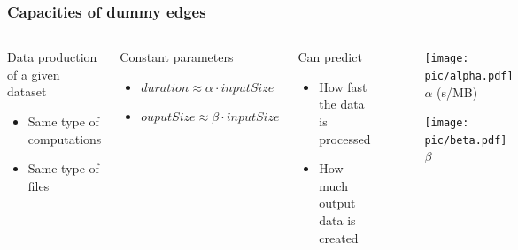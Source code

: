 \documentclass{beamer}
\begin{document}
\begin{frame}\frametitle{Capacities of dummy edges}
\begin{columns}[c]
\begin{block}{Data production of a given dataset}
  \begin{itemize}
    \item Same type of computations
    \item Same type of files 
  \end{itemize}
\end{block}

\begin{block}{Constant parameters}
  \begin{itemize}
    \item $duration \approx \alpha \cdot inputSize $
    \item $ouputSize \approx \beta \cdot  inputSize $ 
  \end{itemize}
\end{block}

\begin{block}{Can predict}
  \begin{itemize}
    \item How fast the data is processed
    \item How much output data is created
  \end{itemize}
\end{block}

\begin{scriptsize}
\vspace{-6mm}
\begin{figure}[h]
	\begin{center}
		\texttt{[image: pic/alpha.pdf]}
	\\{$\alpha$ (s/MB)}	
	\end{center}
\end{figure} 
\vspace{-8mm}
\begin{figure}[h]
	\begin{center}
		\texttt{[image: pic/beta.pdf]}
		\\{$\beta$}
	\end{center}
\end{figure} 
\end{scriptsize}
\end{columns}

\end{frame}
\end{document}

